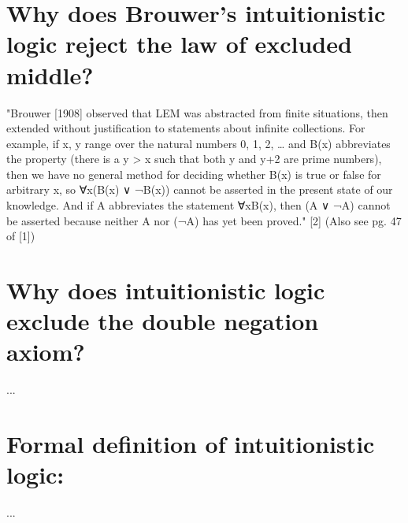 \section{Why does Brouwer's intuitionistic logic reject the law of excluded middle?}
"Brouwer [1908] observed that LEM was abstracted from finite situations, then extended without justification to statements about infinite collections. For example, if x, y range over the natural numbers 0, 1, 2, … and B(x) abbreviates the property (there is a y > x such that both y and y+2 are prime numbers), then we have no general method for deciding whether B(x) is true or false for arbitrary x, so ∀x(B(x) ∨ ¬B(x)) cannot be asserted in the present state of our knowledge. And if A abbreviates the statement ∀xB(x), then (A ∨ ¬A) cannot be asserted because neither A nor (¬A) has yet been proved." [2] (Also see pg. 47 of [1])

\section{Why does intuitionistic logic exclude the double negation axiom?}
...

\section{Formal definition of intuitionistic logic:}
...


